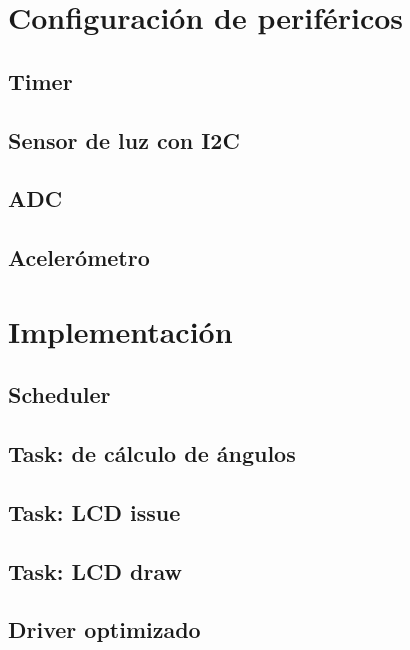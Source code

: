 \section{Configuración de periféricos}

\subsection{Timer}

\subsection{Sensor de luz con I2C}


\subsection{ ADC}

\subsection{Acelerómetro}

\section{Implementación}

\subsection{Scheduler}


\subsection{Task: de cálculo de ángulos}

\subsection{Task: LCD issue}

\subsection{Task: LCD draw}

\subsection{Driver optimizado}

